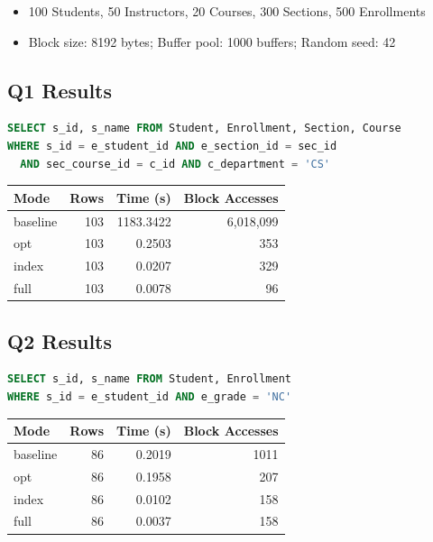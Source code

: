 \documentclass[12pt,a4paper]{article}
\begin{document}
\begin{itemize}[nosep]
  \item 100 Students, 50 Instructors, 20 Courses, 300 Sections, 500 Enrollments
  \item Block size: 8192 bytes; Buffer pool: 1000 buffers; Random seed: 42
\end{itemize}

\subsection{Q1 Results}

\begin{lstlisting}[style=sqlstyle,language=SQL]
SELECT s_id, s_name FROM Student, Enrollment, Section, Course
WHERE s_id = e_student_id AND e_section_id = sec_id
  AND sec_course_id = c_id AND c_department = 'CS'
\end{lstlisting}

\begin{center}
  \begin{tabular}{l r r r}
    \toprule
    \textbf{Mode} & \textbf{Rows} & \textbf{Time (s)} & \textbf{Block Accesses} \\
    \midrule
    baseline      & 103           & 1183.3422         & 6,018,099               \\
    opt           & 103           & 0.2503            & 353                     \\
    index         & 103           & 0.0207            & 329                     \\
    full          & 103           & 0.0078            & 96                      \\
    \bottomrule
  \end{tabular}
\end{center}

\subsection{Q2 Results}

\begin{lstlisting}[style=sqlstyle,language=SQL]
SELECT s_id, s_name FROM Student, Enrollment
WHERE s_id = e_student_id AND e_grade = 'NC'
\end{lstlisting}

\begin{center}
  \begin{tabular}{l r r r}
    \toprule
    \textbf{Mode} & \textbf{Rows} & \textbf{Time (s)} & \textbf{Block Accesses} \\
    \midrule
    baseline      & 86            & 0.2019            & 1011                    \\
    opt           & 86            & 0.1958            & 207                     \\
    index         & 86            & 0.0102            & 158                     \\
    full          & 86            & 0.0037            & 158                     \\
    \bottomrule
  \end{tabular}
\end{center}
\end{document}
